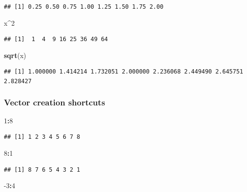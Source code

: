 \documentclass[]{book}
\newenvironment{Shaded}{\begin{snugshade}}{\end{snugshade}}
\newcommand{\DecValTok}[1]{\textcolor[rgb]{0.00,0.00,0.81}{#1}}
\newcommand{\KeywordTok}[1]{\textcolor[rgb]{0.13,0.29,0.53}{\textbf{#1}}}
\newcommand{\NormalTok}[1]{#1}
\newcommand{\OperatorTok}[1]{\textcolor[rgb]{0.81,0.36,0.00}{\textbf{#1}}}
\theoremstyle{definition}
\theoremstyle{definition}
\theoremstyle{definition}
\theoremstyle{remark}
\begin{document}
\begin{verbatim}
## [1] 0.25 0.50 0.75 1.00 1.25 1.50 1.75 2.00
\end{verbatim}

\begin{Shaded}
\begin{Highlighting}[]
\NormalTok{x}\OperatorTok{^}\DecValTok{2}
\end{Highlighting}
\end{Shaded}

\begin{verbatim}
## [1]  1  4  9 16 25 36 49 64
\end{verbatim}

\begin{Shaded}
\begin{Highlighting}[]
\KeywordTok{sqrt}\NormalTok{(x)}
\end{Highlighting}
\end{Shaded}

\begin{verbatim}
## [1] 1.000000 1.414214 1.732051 2.000000 2.236068 2.449490 2.645751 2.828427
\end{verbatim}

\hypertarget{vector-creation-shortcuts}{%
\subsubsection{Vector creation
shortcuts}\label{vector-creation-shortcuts}}

\begin{Shaded}
\begin{Highlighting}[]
\DecValTok{1}\OperatorTok{:}\DecValTok{8}
\end{Highlighting}
\end{Shaded}

\begin{verbatim}
## [1] 1 2 3 4 5 6 7 8
\end{verbatim}

\begin{Shaded}
\begin{Highlighting}[]
\DecValTok{8}\OperatorTok{:}\DecValTok{1}
\end{Highlighting}
\end{Shaded}

\begin{verbatim}
## [1] 8 7 6 5 4 3 2 1
\end{verbatim}

\begin{Shaded}
\begin{Highlighting}[]
\DecValTok{-3}\OperatorTok{:}\DecValTok{4}
\end{Highlighting}
\end{Shaded}
\end{document}
